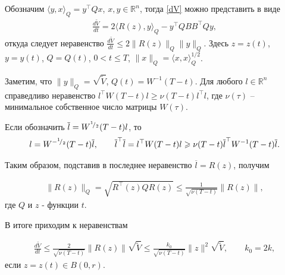 \documentclass[../main.tex]{subfiles}
\begin{document}
Обозначим $ \langle y, x \rangle_Q = y^{\top} Q x $, $ x,y \in \mathbb{R}^n $, тогда \eqref{dV}  можно представить в виде 
\begin{gather*}
    \frac{d\widetilde{V}}{dt} = 2 \langle R(z),y\rangle_Q - y^{\top} Q BB^{\top} Q y,
\end{gather*}
откуда следует неравенство $
    \frac{d\widetilde{V}}{dt} \leqslant 2 \| R(z) \|_Q \| y\|_Q. $
Здесь $ z = z(t) $, $ y = y(t) $, $Q = Q(t) $, $ 0 < t \leqslant T $, 
$\| x \|_Q =\langle x,x\rangle_Q^{1/2}$.

Заметим, что $\| y \|_Q  = \sqrt{\widetilde{V}}$,
 $ Q(t) = W^{-1}(T - t)$. Для любого $ l\in \mathbb{R}^n $ справедливо неравенство $ l^{\top} W(T - t) l \geqslant \nu(T - t) l^{\top} l $, где $ \nu(\tau) $ -- минимальное собственное число матрицы $ W(\tau) $.

Если обозначить $ \overline{l} = W^{{}^{1}\!/_{2}}(T - t)l $, то
\begin{gather*}
	l = W^{-{}^{1}\!/_{2}}(T - t)\overline{l}, \qquad \overline{l}^{\top} \overline{l} = l^{\top} W(T - t) l 
	\geqslant \nu(T - t)  \overline{l}^{\top} W^{-1}(T - t)\overline{l}.
\end{gather*}

Таким образом, подставив в последнее неравенство $ \overline{l} = R(z) $, получим 

\begin{gather*}
    \| R(z) \|_Q = \sqrt{R^{\top}(z) Q R(z)} \leqslant \frac{1}{\sqrt{\nu(T - t)}} \| R(z)\|,
\end{gather*}
где $ Q $ и $ z $ - функции $ t $.

В итоге приходим к неравенствам

\begin{gather*}
    \frac{d\widetilde{V}}{dt} \leqslant \frac{2}{\sqrt{\nu(T - t)}} \| R(z) \| \sqrt{\widetilde{V}} \leqslant \frac{k_0}{\sqrt{\nu(T - t)}} \|z\|^2 \sqrt{\widetilde{V}}, \qquad k_0 = 2k, 
\end{gather*}
если $ z=z(t) \in B(0,r) $.
\end{document}
